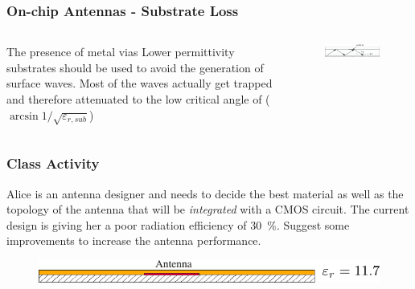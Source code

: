 \documentclass[10pt]{beamer}
\newcommand{\E}{\varepsilon}  %
\begin{document}
\begin{frame}
    \frametitle{On-chip Antennas - Substrate Loss}
    \begin{columns}
        \begin{column}{.5\textwidth}
            \begin{outline}
                \1 The presence of metal vias
                \1 Lower permittivity substrates should be used to avoid the generation of surface waves.
                \1 Most of the waves actually get trapped and therefore attenuated to the low critical angle of  ($\arcsin 1/\sqrt{\E_{r,sub}}$)
            \end{outline}
        \end{column}
        \begin{column}{.5\textwidth}
            \begin{figure}[]
                \centering
                \includegraphics[width=1\textwidth]{surface_waves_onchipantennas.pdf}
                \label{fig:meta_vias}
            \end{figure}
        \end{column}
    \end{columns}
\end{frame}

\begin{frame}
    \frametitle{Class Activity}

    Alice is an antenna designer and needs to decide the best material as well as the topology of the antenna that will be \textit{integrated} with a CMOS circuit. The current design is giving her a poor radiation efficiency of \SI{30}{\percent}. Suggest some improvements to increase the antenna performance.

    \begin{figure}[h!]
        \centering
        \includegraphics[width=.75\textwidth]{exercise.pdf}
    \end{figure}
\end{frame}

\end{document}
